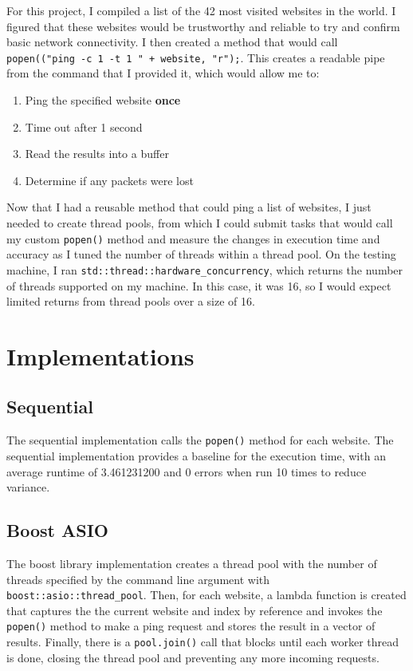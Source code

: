 \documentclass[12pt]{article}
\begin{document}
For this project, I compiled a list of the 42 most visited websites in the world. I figured that these websites would be trustworthy and reliable to try and confirm basic network connectivity. I then created a method that would call \texttt{popen(("ping -c 1 -t 1 " + website, "r");}. This creates a readable pipe from the command that I provided it, which would allow me to:
\begin{enumerate}
    \item Ping the specified website \textbf{once}
    \item Time out after 1 second
    \item Read the results into a buffer 
    \item Determine if any packets were lost
\end{enumerate}

Now that I had a reusable method that could ping a list of websites, I just needed to create thread pools, from which I could submit tasks that would call my custom   \texttt{popen()} method and measure the changes in execution time and accuracy as I tuned the number of threads within a thread pool. On the testing machine, I ran 
\texttt{std::thread::hardware\_concurrency}, which returns the number of threads supported on my machine. In this case, it was 16, so I would expect limited returns from thread pools over a size of 16.

\section{Implementations}

\subsection{Sequential}

The sequential implementation calls the \texttt{popen()} method for each website. The sequential implementation provides a baseline for the execution time, with an average runtime of 3.461231200 and 0 errors when run 10 times to reduce variance.

\subsection{Boost ASIO}

The boost library implementation creates a thread pool with the number of threads specified by the command line argument with \texttt{boost::asio::thread\_pool}. Then, for each website, a lambda function is created that captures the the current website and index by reference and invokes the \texttt{popen()} method to make a ping request and stores the result in a vector of results. Finally, there is a \texttt{pool.join()} call that blocks until each worker thread is done, closing the thread pool and preventing any more incoming requests. 
\end{document}
